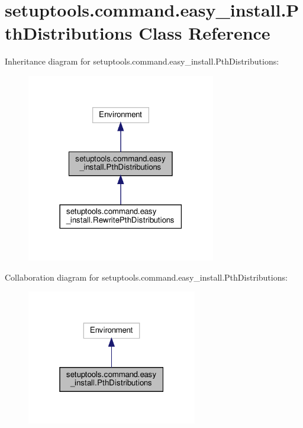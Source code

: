 \hypertarget{classsetuptools_1_1command_1_1easy__install_1_1PthDistributions}{}\section{setuptools.\+command.\+easy\+\_\+install.\+Pth\+Distributions Class Reference}
\label{classsetuptools_1_1command_1_1easy__install_1_1PthDistributions}


Inheritance diagram for setuptools.\+command.\+easy\+\_\+install.\+Pth\+Distributions\+:
\nopagebreak
\begin{figure}[H]
\begin{center}
\leavevmode
\includegraphics[width=234pt]{classsetuptools_1_1command_1_1easy__install_1_1PthDistributions__inherit__graph}
\end{center}
\end{figure}


Collaboration diagram for setuptools.\+command.\+easy\+\_\+install.\+Pth\+Distributions\+:
\nopagebreak
\begin{figure}[H]
\begin{center}
\leavevmode
\includegraphics[width=211pt]{classsetuptools_1_1command_1_1easy__install_1_1PthDistributions__coll__graph}
\end{center}
\end{figure}
